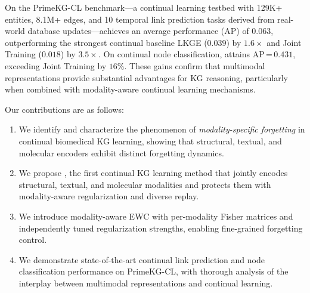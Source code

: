 On the PrimeKG-CL benchmark---a continual learning testbed with 129K+ entities, 8.1M+ edges, and 10 temporal link prediction tasks derived from real-world database updates---\ours achieves an average performance (AP) of $0.063$, outperforming the strongest continual baseline LKGE ($0.039$) by $1.6\times$ and Joint Training ($0.018$) by $3.5\times$.
On continual node classification, \ours attains AP\,=\,$0.431$, exceeding Joint Training by $16\%$.
These gains confirm that multimodal representations provide substantial advantages for KG reasoning, particularly when combined with modality-aware continual learning mechanisms.



Our contributions are as follows:
\begin{enumerate}
    \item We identify and characterize the phenomenon of \emph{modality-specific forgetting} in continual biomedical KG learning, showing that structural, textual, and molecular encoders exhibit distinct forgetting dynamics.
    \item We propose \ours, the first continual KG learning method that jointly encodes structural, textual, and molecular modalities and protects them with modality-aware regularization and diverse replay.
    \item We introduce modality-aware EWC with per-modality Fisher matrices and independently tuned regularization strengths, enabling fine-grained forgetting control.
    \item We demonstrate state-of-the-art continual link prediction and node classification performance on PrimeKG-CL, with thorough analysis of the interplay between multimodal representations and continual learning.
\end{enumerate}
